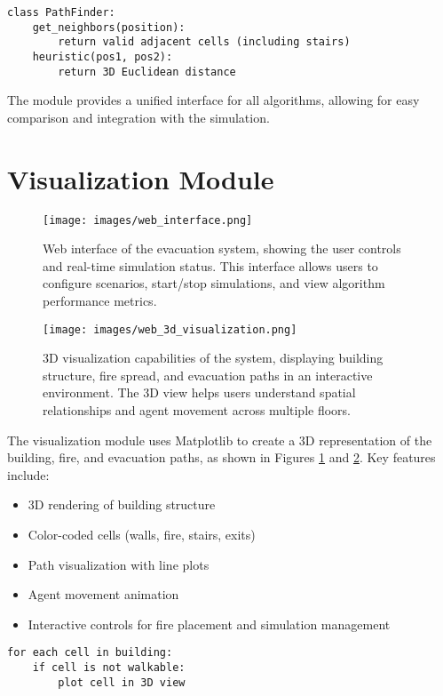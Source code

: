 \documentclass[11pt,a4paper]{report}
\begin{document}
\begin{verbatim}
class PathFinder:
    get_neighbors(position):
        return valid adjacent cells (including stairs)
    heuristic(pos1, pos2):
        return 3D Euclidean distance
\end{verbatim}

The module provides a unified interface for all algorithms, allowing for easy comparison and integration with the simulation.

\section{Visualization Module}
\begin{figure}[H]
    \centering
    \texttt{[image: images/web\_interface.png]}
    \caption{Web interface of the evacuation system, showing the user controls and real-time simulation status. This interface allows users to configure scenarios, start/stop simulations, and view algorithm performance metrics.}
    \label{fig:web_interface}
\end{figure}

\begin{figure}[H]
    \centering
    \texttt{[image: images/web\_3d\_visualization.png]}
    \caption{3D visualization capabilities of the system, displaying building structure, fire spread, and evacuation paths in an interactive environment. The 3D view helps users understand spatial relationships and agent movement across multiple floors.}
    \label{fig:web_3d_visualization}
\end{figure}

The visualization module uses Matplotlib to create a 3D representation of the building, fire, and evacuation paths, as shown in Figures \ref{fig:web_interface} and \ref{fig:web_3d_visualization}. Key features include:
\begin{itemize}
    \item 3D rendering of building structure
    \item Color-coded cells (walls, fire, stairs, exits)
    \item Path visualization with line plots
    \item Agent movement animation
    \item Interactive controls for fire placement and simulation management
\end{itemize}

\begin{verbatim}
for each cell in building:
    if cell is not walkable:
        plot cell in 3D view
\end{verbatim}
\end{document}
